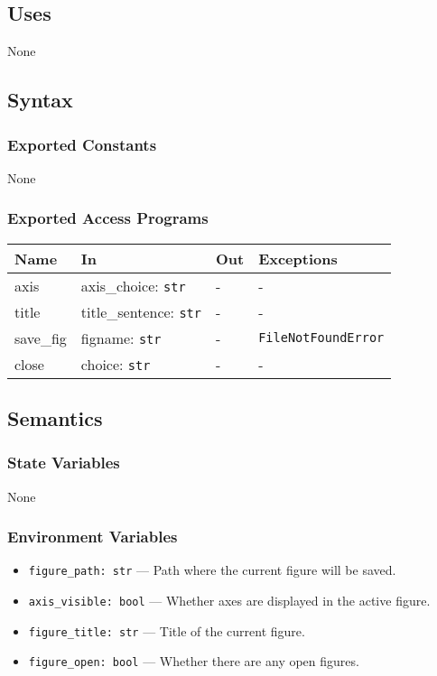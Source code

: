 \documentclass[12pt, titlepage]{article}
\begin{document}
\subsection{Uses}
None

\subsection{Syntax}

\subsubsection{Exported Constants}
None

\subsubsection{Exported Access Programs}

\begin{center}
\begin{tabular}{p{3.2cm} >{\raggedright\arraybackslash}p{5.5cm} p{4cm} p{2.5cm}}
\hline
\textbf{Name} & \textbf{In} & \textbf{Out} & \textbf{Exceptions} \\
\hline
axis & axis\_choice: \texttt{str} & - & - \\
title & title\_sentence: \texttt{str} & - & - \\
save\_fig & figname: \texttt{str} & - & \texttt{FileNotFoundError} \\
close & choice: \texttt{str} & - & - \\
\hline
\end{tabular}
\end{center}

\subsection{Semantics}

\subsubsection{State Variables}
None

\subsubsection{Environment Variables}
\begin{itemize}
  \item \texttt{figure\_path: str} — Path where the current figure will be saved.
  \item \texttt{axis\_visible: bool} — Whether axes are displayed in the active figure.
  \item \texttt{figure\_title: str} — Title of the current figure.
  \item \texttt{figure\_open: bool} — Whether there are any open figures.
\end{itemize}
\end{document}
